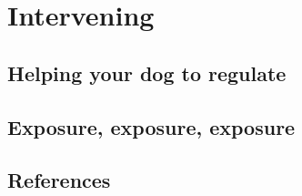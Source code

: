 \documentclass[
]{book}
\begin{document}
\hypertarget{part-intervening}{%
\part{Intervening}\label{part-intervening}}

\hypertarget{helping-your-dog-to-regulate}{%
\chapter{Helping your dog to regulate}\label{helping-your-dog-to-regulate}}

\hypertarget{exposure-exposure-exposure}{%
\chapter{Exposure, exposure, exposure}\label{exposure-exposure-exposure}}

\hypertarget{references}{%
\chapter{References}\label{references}}

  

\printindex
\end{document}
